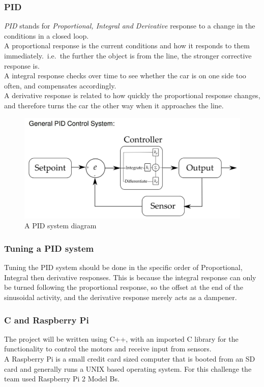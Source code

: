 \documentclass[paper=a4, fontsize=11pt]{scrartcl} %
\numberwithin{equation}{section} %
\numberwithin{figure}{section} %
\begin{document}
\subsubsection{PID}
\textit{PID} stands for \textit{Proportional, Integral and Derivative} response
to a change in the conditions in a closed loop.\\
A proportional response is the current conditions and how it responds to them
immediately.\ i.e.\ the further the object is from the line, the stronger
corrective response is.\\
A integral response checks over time to see whether the car is on one side too
often, and compensates accordingly.\\
A derivative response is related to how quickly the proportional response
changes, and therefore turns the car the other way when it approaches the line.
\begin{figure}[h]
\centering
\includegraphics[width=\textwidth]{pid.png}
\caption{A PID system diagram\autocite{elfClosedLoops}}
\end{figure}
\subsubsection{Tuning a PID system}
Tuning the PID system should be done in the specific order of Proportional,
Integral then derivative responses. This is because the integral response can
only be turned following the proportional response, so the offset at the end of
the sinusoidal activity, and the derivative response merely acts as a
dampener\autocite{pidTuning}\autocite{pidVid}.\\
\subsubsection{C and Raspberry Pi}
The project will be written using C++, with  an imported C library for the
functionality to control the motors and receive input from sensors.\\
A Raspberry Pi is a small credit card sized computer that is booted from an SD
card and generally runs a UNIX based operating system. For this challenge the
team used Raspberry Pi 2 Model Bs.
\end{document}
